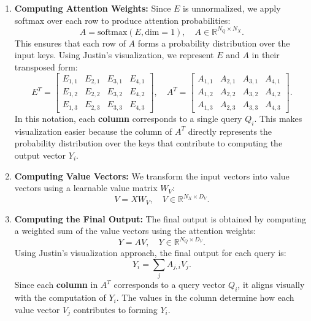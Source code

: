 \begin{enumerate}
    \item \textbf{Computing Attention Weights:} Since \( E \) is unnormalized, we apply softmax over each row to produce attention probabilities:
    \begin{equation}
        A = \text{softmax}(E, \text{dim} = 1), \quad A \in \mathbb{R}^{N_Q \times N_X}.
    \end{equation}
    This ensures that each row of \( A \) forms a probability distribution over the input keys. Using Justin’s visualization, we represent \( E \) and \( A \) in their transposed form:
    \begin{equation}
        E^T =
        \begin{bmatrix}
            E_{1,1} & E_{2,1} & E_{3,1} & E_{4,1} \\
            E_{1,2} & E_{2,2} & E_{3,2} & E_{4,2} \\
            E_{1,3} & E_{2,3} & E_{3,3} & E_{4,3}
        \end{bmatrix}, \quad
        A^T =
        \begin{bmatrix}
            A_{1,1} & A_{2,1} & A_{3,1} & A_{4,1} \\
            A_{1,2} & A_{2,2} & A_{3,2} & A_{4,2} \\
            A_{1,3} & A_{2,3} & A_{3,3} & A_{4,3}
        \end{bmatrix}.
    \end{equation}
    In this notation, each \textbf{column} corresponds to a single query \( Q_i \). This makes visualization easier because the column of \( A^T \) directly represents the probability distribution over the keys that contribute to computing the output vector \( Y_i \).
    
    \item \textbf{Computing Value Vectors:} We transform the input vectors into value vectors using a learnable value matrix \( W_V \):
    \begin{equation}
        V = X W_V, \quad V \in \mathbb{R}^{N_X \times D_V}.
    \end{equation}
    
    \item \textbf{Computing the Final Output:} The final output is obtained by computing a weighted sum of the value vectors using the attention weights:
    \begin{equation}
        Y = A V, \quad Y \in \mathbb{R}^{N_Q \times D_V}.
    \end{equation}
    Using Justin’s visualization approach, the final output for each query is:
    \begin{equation}
        Y_i = \sum_{j} A_{j,i} V_j.
    \end{equation}
    Since each \textbf{column} in \( A^T \) corresponds to a query vector \( Q_i \), it aligns visually with the computation of \( Y_i \). The values in the column determine how each value vector \( V_j \) contributes to forming \( Y_i \).
\end{enumerate}

